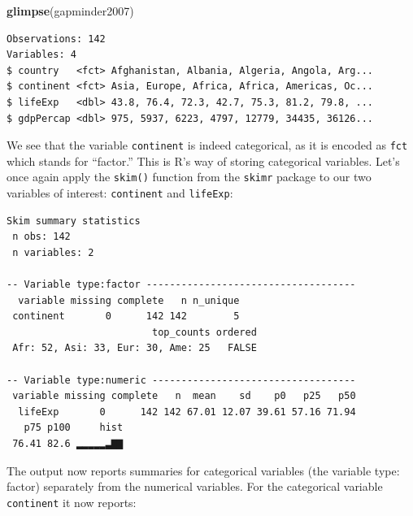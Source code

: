 \documentclass[12pt,]{krantz}
\makeatletter
\newenvironment{Shaded}{\begin{snugshade}}{\end{snugshade}}
\newcommand{\KeywordTok}[1]{\textcolor[rgb]{0.27,0.27,0.27}{\textbf{#1}}}
\newcommand{\StringTok}[1]{\textcolor[rgb]{0.5,0.5,0.5}{#1}}
\newcommand{\OperatorTok}[1]{\textcolor[rgb]{0.43,0.43,0.43}{\textbf{#1}}}
\newcommand{\NormalTok}[1]{#1}
\newenvironment{kframe}{%
\medskip{}
\setlength{\fboxsep}{.8em}
 \def\at@end@of@kframe{}%
 \ifinner\ifhmode%
  \def\at@end@of@kframe{\end{minipage}}%
  \begin{minipage}{\columnwidth}%
 \fi\fi%
 \def\FrameCommand##1{\hskip\@totalleftmargin \hskip-\fboxsep
 \colorbox{shadecolor}{##1}\hskip-\fboxsep
     \hskip-\linewidth \hskip-\@totalleftmargin \hskip\columnwidth}%
 \MakeFramed {\advance\hsize-\width
   \@totalleftmargin\z@ \linewidth\hsize
   \@setminipage}}%
 {\par\unskip\endMakeFramed%
 \at@end@of@kframe}
\renewenvironment{Shaded}{\begin{kframe}}{\end{kframe}}
\theoremstyle{definition}
\theoremstyle{definition}
\theoremstyle{definition}
\theoremstyle{remark}
\makeatother
\begin{document}
\begin{Shaded}
\begin{Highlighting}[]
\KeywordTok{glimpse}\NormalTok{(gapminder2007)}
\end{Highlighting}
\end{Shaded}

\begin{verbatim}
Observations: 142
Variables: 4
$ country   <fct> Afghanistan, Albania, Algeria, Angola, Arg...
$ continent <fct> Asia, Europe, Africa, Africa, Americas, Oc...
$ lifeExp   <dbl> 43.8, 76.4, 72.3, 42.7, 75.3, 81.2, 79.8, ...
$ gdpPercap <dbl> 975, 5937, 6223, 4797, 12779, 34435, 36126...
\end{verbatim}

We see that the variable \texttt{continent} is indeed categorical, as it
is encoded as \texttt{fct} which stands for ``factor.'' This is R's way
of storing categorical variables. Let's once again apply the
\texttt{skim()} function from the \texttt{skimr} package to our two
variables of interest: \texttt{continent} and \texttt{lifeExp}:

\begin{Shaded}
\end{Shaded}

\begin{verbatim}
Skim summary statistics
 n obs: 142 
 n variables: 2 

-- Variable type:factor ------------------------------------
  variable missing complete   n n_unique
 continent       0      142 142        5
                         top_counts ordered
 Afr: 52, Asi: 33, Eur: 30, Ame: 25   FALSE

-- Variable type:numeric -----------------------------------
 variable missing complete   n  mean    sd    p0   p25   p50
  lifeExp       0      142 142 67.01 12.07 39.61 57.16 71.94
   p75 p100     hist
 76.41 82.6 ▂▂▂▂▂▃▇▇
\end{verbatim}

The output now reports summaries for categorical variables (the variable
type: factor) separately from the numerical variables. For the
categorical variable \texttt{continent} it now reports:
\end{document}
